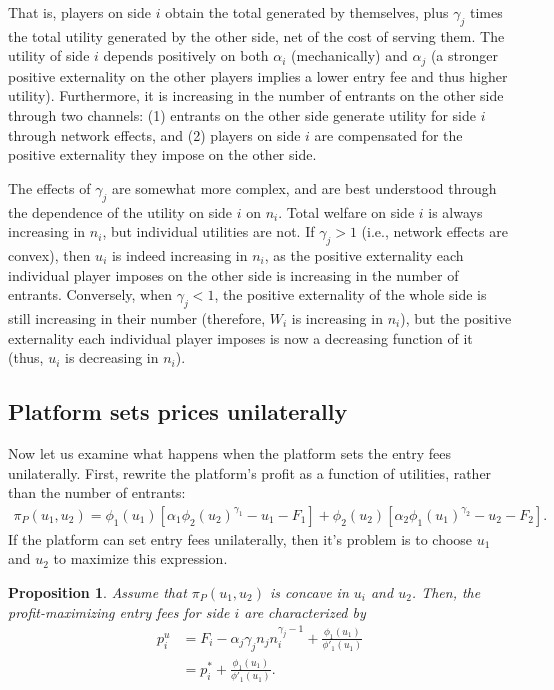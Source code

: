 \documentclass[a4paper]{article}
\newtheorem{proposition}{Proposition}
\begin{document}
That is, players on side $i$ obtain the total generated by themselves, plus $\gamma_j$ times the total utility generated by the other side, net of the cost of serving them.
The utility of side $i$ depends positively on both $\alpha_i$ (mechanically) and $\alpha_j$ (a stronger positive externality on the other players implies a lower entry fee and thus higher utility).
Furthermore, it is increasing in the number of entrants on the other side through two channels: (1) entrants on the other side generate utility for side $i$ through network effects, and (2) players on side $i$ are compensated for the positive externality they impose on the other side.

The effects of $\gamma_j$ are somewhat more complex, and are best understood through the dependence of the utility on side $i$ on $n_i$.
Total welfare on side $i$ is always increasing in $n_i$, but individual utilities are not.
If $\gamma_j > 1$ (i.e., network effects are convex), then $u_i$ is indeed increasing in $n_i$, as the positive externality each individual player imposes on the other side is increasing in the number of entrants.
Conversely, when $\gamma_j < 1$, the positive externality of the whole side is still increasing in their number (therefore, $W_i$ is increasing in $n_i$), but the positive externality each individual player imposes is now a decreasing function of it (thus, $u_i$ is decreasing in $n_i$).

\subsection{Platform sets prices unilaterally}

Now let us examine what happens when the platform sets the entry fees unilaterally.
First, rewrite the platform's profit as a function of utilities, rather than the number of entrants:
\begin{align*}
    \pi_P(u_1, u_2) = \phi_1(u_1) [\alpha_1 \phi_2(u_2) ^ {\gamma_1} - u_1 - F_1] + \phi_2(u_2) [\alpha_2 \phi_1(u_1) ^ {\gamma_2} - u_2 - F_2].
\end{align*}
If the platform can set entry fees unilaterally, then it's problem is to choose $u_1$ and $u_2$ to maximize this expression.

\begin{proposition}
    \label{prop:unilateral_entry_fees}
    Assume that $\pi_P(u_1, u_2)$ is concave in $u_i$ and $u_2$.
    Then, the profit-maximizing entry fees for side $i$ are characterized by
    \begin{align*}
        p_i^u &= F_i - \alpha_j \gamma_j n_j n_i^{\gamma_j - 1} + \frac{\phi_1(u_1)}{\phi'_1(u_1)} \\
              &= p_i^* + \frac{\phi_1(u_1)}{\phi'_1(u_1)}.
    \end{align*}
\end{proposition}
\end{document}

